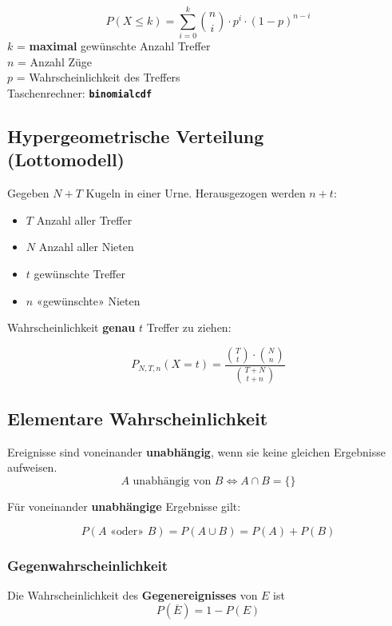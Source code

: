\begin{multicols}{2}
\begin{tcolorbox}[colback=white]
$$P(X\le k) = \sum_{i=0}^{k}{n \choose i}\cdot{}p^i\cdot{}(1-p)^{n-i}$$
$k$ = \textbf{maximal} gewünschte Anzahl Treffer\\
$n$ = Anzahl Züge\\
$p$ = Wahrscheinlichkeit des Treffers\\
Taschenrechner: \textbf{\texttt{binomialcdf}}
\end{tcolorbox}


\subsection*{Hypergeometrische Verteilung\\ (Lottomodell)}
\begin{tcolorbox}[colback=white]
Gegeben $N+T$ Kugeln in einer Urne. Herausgezogen werden $n+t$:
\begin{itemize}
\item $T$ Anzahl aller Treffer
\item $N$ Anzahl aller Nieten
\item $t$ gewünschte Treffer
\item $n$ «gewünschte» Nieten
\end{itemize}
Wahrscheinlichkeit \textbf{genau} $t$ Treffer zu ziehen:

$$P_{N,T,n}(X=t) = \frac{ {T \choose t} \cdot {N  \choose n} }{{T+N \choose t+n}}$$

\end{tcolorbox}



\subsection*{Elementare Wahrscheinlichkeit}
Ereignisse sind voneinander \textbf{unabhängig}, wenn sie keine
gleichen Ergebnisse aufweisen.
$$A \textrm{ unabhängig von } B \Leftrightarrow A\cap B=\{\}$$

Für voneinander \textbf{unabhängige} Ergebnisse 
gilt:

$$P(A\textrm{ «oder» }B) = P(A\cup B) = P(A) + P(B)$$
\keinHeaderUndKeinFooter{}


\subsubsection*{Gegenwahrscheinlichkeit}
Die Wahrscheinlichkeit des \textbf{Gegenereignisses} von $E$ ist
$$P(\overline{E}) = 1- P(E)$$


\end{multicols}
